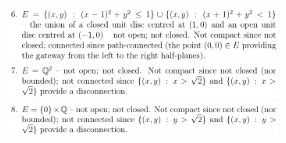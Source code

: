 \documentclass[8pt,landscape]{article}
\begin{document}
\begin{multicols}{3}
    \includegraphics[width=270]{160.png} \\
    \includegraphics[width=270]{161.png} \\
    \includegraphics[width=270]{162.png} \\
\end{multicols}
\end{document}
